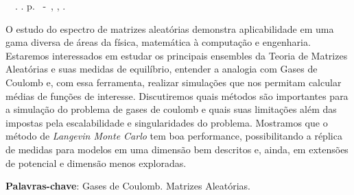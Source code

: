 \setlength{\absparsep}{18pt} %
\begin{resumo}
	\begin{flushleft} 
			\setlength{\absparsep}{0pt} %
			\SingleSpacing 
			\imprimirautorabr~~\textbf{\imprimirtituloresumo}.	\imprimirdata. \pageref{LastPage}p. 
			\imprimirtipotrabalho~-~\imprimirinstituicao, \imprimirlocal, \imprimirdata. 
 	\end{flushleft}
\OnehalfSpacing 	
		
O estudo do espectro de matrizes aleatórias demonstra aplicabilidade em uma gama diversa de áreas da física, matemática à computação e engenharia. Estaremos interessados em estudar os principais ensembles da Teoria de Matrizes Aleatórias e suas medidas de equilíbrio, entender a analogia com Gases de Coulomb e, com essa ferramenta, realizar simulações que nos permitam calcular médias de funções de interesse. Discutiremos quais métodos são importantes para a simulação do problema de gases de coulomb e quais suas limitações além das impostas pela escalabilidade e singularidades do problema. Mostramos que o método de \textit{Langevin Monte Carlo} tem boa performance, possibilitando a réplica de medidas para modelos em uma dimensão bem descritos e, ainda, em extensões de potencial e dimensão menos exploradas.

 \textbf{Palavras-chave}: Gases de Coulomb. Matrizes Aleatórias. 
\end{resumo}